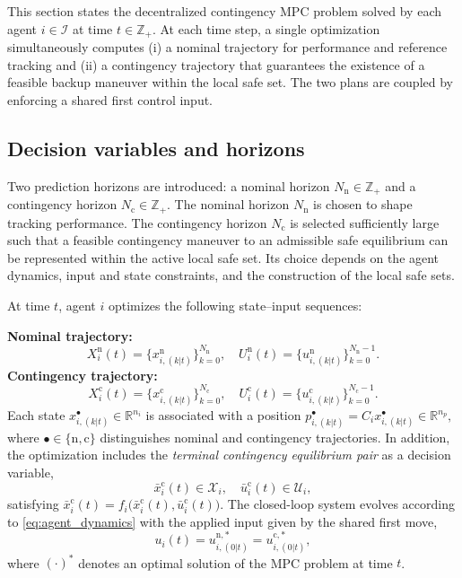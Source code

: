 \documentclass[twocolumn]{autart}
\begin{document}
This section states the decentralized contingency MPC problem solved by each agent $i\in\mathcal{I}$ at time $t\in\mathbb{Z}_+$.
At each time step, a single optimization simultaneously computes
(i) a nominal trajectory for performance and reference tracking and
(ii) a contingency trajectory that guarantees the existence of a feasible
backup maneuver within the local safe set.
The two plans are coupled by enforcing a shared first control input.

\subsection{Decision variables and horizons}
\label{subsec:variables_horizons}
Two prediction horizons are introduced: a nominal horizon $N_{\mathrm{n}}\in\mathbb{Z}_+$
and a contingency horizon $N_{\mathrm{c}}\in\mathbb{Z}_+$.
The nominal horizon $N_{\mathrm{n}}$ is chosen to shape tracking performance.
The contingency horizon $N_{\mathrm{c}}$ is selected sufficiently large such that a feasible contingency maneuver to an admissible safe equilibrium can be represented within the active local safe set.
Its choice depends on the agent dynamics, input and state constraints, and the construction of the local safe sets.

At time $t$, agent $i$ optimizes the following state--input sequences:

\textbf{Nominal trajectory:}
\[
X_i^\mathrm n(t) = \{x^{\mathrm{n}}_{i,(k|t)}\}_{k=0}^{N_{\mathrm{n}}}, \quad
U_i^\mathrm n(t) = \{u^{\mathrm{n}}_{i,(k|t)}\}_{k=0}^{N_{\mathrm{n}}-1}.
\]
\textbf{Contingency trajectory:}
\[
X_i^\mathrm c(t) = \{x^{\mathrm{c}}_{i,(k|t)}\}_{k=0}^{N_{\mathrm{c}}}, \quad
U_i^\mathrm c(t) = \{u^{\mathrm{c}}_{i,(k|t)}\}_{k=0}^{N_{\mathrm{c}}-1}.
\]
Each state $x^{\bullet}_{i,(k|t)} \in \mathbb{R}^{n_i}$ is associated with a position
\(
p^{\bullet}_{i,(k|t)} = C_i x^{\bullet}_{i,(k|t)} \in \mathbb{R}^{n_p},
\)
where $\bullet \in \{\mathrm{n},\mathrm{c}\}$ distinguishes nominal and contingency trajectories. In addition, the optimization includes the \emph{terminal contingency equilibrium pair} as a decision variable,
\begin{equation}
\bar{x}^{\mathrm{c}}_i(t) \in \mathcal X_i, \quad 
\bar{u}^{\mathrm{c}}_i(t) \in\mathcal{U}_i,  
\end{equation}
satisfying
\(
\bar{x}^{\mathrm{c}}_i(t) = f_i\big(\bar{x}^{\mathrm{c}}_i(t), \bar{u}^{\mathrm{c}}_i(t)\big).
\)
The closed-loop system evolves according to \eqref{eq:agent_dynamics} with the applied input given by the shared first move,
\begin{equation}
u_i(t) = u^{\mathrm{n},*}_{i,(0|t)} = u^{\mathrm{c},*}_{i,(0|t)},
\label{eq:shared_input_applied}
\end{equation}
where $(\cdot)^\ast$ denotes an optimal solution of the MPC problem at time $t$.
\end{document}
